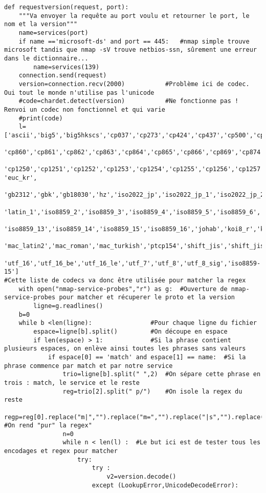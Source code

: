 \begin{appendix}
\begin{lstlisting}
def requestversion(request, port):
	"""Va envoyer la requête au port voulu et retourner le port, le nom et la version"""
	name=services(port)
	if name =='microsoft-ds' and port == 445: 	#nmap simple trouve microsoft tandis que nmap -sV trouve netbios-ssn, sûrement une erreur dans le dictionnaire...
		name=services(139)
	connection.send(request)
	version=connection.recv(2000)			#Problème ici de codec. Oui tout le monde n'utilise pas l'unicode
	#code=chardet.detect(version) 			#Ne fonctionne pas ! Renvoi un codec non fonctionnel et qui varie 
	#print(code)
	l=['ascii','big5','big5hkscs','cp037','cp273','cp424','cp437','cp500','cp720','cp737','cp775','cp850','cp852','cp855','cp856','cp857','cp858',
	'cp860','cp861','cp862','cp863','cp864','cp865','cp866','cp869','cp874','cp875','cp932','cp949','cp950','cp1006','cp1026','cp1125','cp1140',
	'cp1250','cp1251','cp1252','cp1253','cp1254','cp1255','cp1256','cp1257','cp1258','cp65001','euc_jp','euc_jis_2004','euc_jisx0213', 'euc_kr',
	 'gb2312','gbk','gb18030','hz','iso2022_jp','iso2022_jp_1','iso2022_jp_2','iso2022_jp_2004','iso2022_jp_3','iso2022_jp_ext','iso2022_kr',
	 'latin_1','iso8859_2','iso8859_3','iso8859_4','iso8859_5','iso8859_6','iso8859_7','iso8859_8','iso8859_9','iso8859_10','iso8859_11',
	 'iso8859_13','iso8859_14','iso8859_15','iso8859_16','johab','koi8_r','koi8_t','koi8_u','kz1048','mac_cyrillic','mac_greek','mac_iceland',
	 'mac_latin2','mac_roman','mac_turkish','ptcp154','shift_jis','shift_jis_2004','shift_jisx0213','utf_32','utf_32_be','utf_32_le',
	 'utf_16','utf_16_be','utf_16_le','utf_7','utf_8','utf_8_sig','iso8859-15']
#Cette liste de codecs va donc être utilisée pour matcher la regex
	with open("nmap-service-probes","r") as g:	#Ouverture de nmap-service-probes pour matcher et récuperer le proto et la version	
		ligne=g.readlines()
	b=0	
	while b <len(ligne):				#Pour chaque ligne du fichier
		espace=ligne[b].split()			#On découpe en espace
		if len(espace) > 1:				#Si la phrase contient plusieurs espaces, on enlève ainsi toutes les phrases sans valeurs
			if espace[0] == 'match' and espace[1] == name:	#Si la phrase commence par match et par notre service
				trio=ligne[b].split(" ",2)	#On sépare cette phrase en trois : match, le service et le reste
				reg=trio[2].split(" p/")	#On isole la regex du reste
				regp=reg[0].replace("m|","").replace("m=","").replace("|s","").replace("=s","")	#On rend "pur" la regex"
				n=0
				while n < len(l) :	#Le but ici est de tester tous les encodages et regex pour matcher
					try:
						try :
							v2=version.decode()
						except (LookupError,UnicodeDecodeError):

\end{lstlisting}
\end{appendix}
